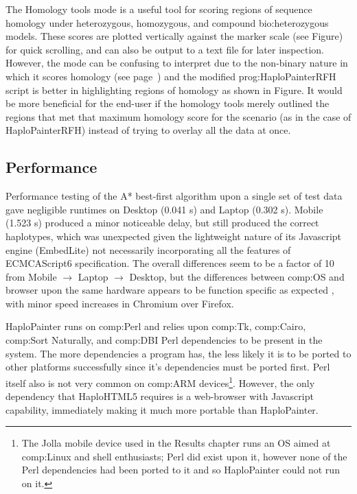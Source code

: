 The Homology tools mode is a useful tool for scoring regions of sequence homology under heterozygous, homozygous, and compound \gls{bio:heterozygous} models. These scores are plotted vertically against the marker scale (see Figure) for quick scrolling, and can also be output to a text file for later inspection. However, the mode can be confusing to interpret due to the non-binary nature in which it scores homology (see page~\pageref{ref:haplo:homologyscoredet}) and the modified \gls{prog:HaploPainterRFH} script is better in highlighting regions of homology as shown in Figure. It would be more beneficial for the end-user if the homology tools merely outlined the regions that met that maximum homology score for the scenario (as in the case of HaploPainterRFH) instead of trying to overlay all the data at once.

\subsection{Performance}

Performance testing of the A* best-first algorithm upon a single set of test data gave negligible runtimes on Desktop (0.041 s) and Laptop (0.302 s). Mobile (1.523 s) produced a minor noticeable delay, but still produced the correct haplotypes, which was unexpected given the lightweight nature of its Javascript engine (EmbedLite) not necessarily incorporating all the features of ECMCAScript6 specification. The overall differences seem to be a factor of 10 from Mobile $\rightarrow$ Laptop $\rightarrow$ Desktop, but the differences between \gls{comp:OS} and browser upon the same hardware appears to be function specific as expected \cite{ratanaworabhan2010jsmeter}, with minor speed increases in Chromium over Firefox.

HaploPainter runs on \gls{comp:Perl} and relies upon \gls{comp:Tk}, \gls{comp:Cairo}, \gls{comp:Sort Naturally}, and \gls{comp:DBI} Perl dependencies to be present in the system. The more dependencies a program has, the less likely it is to be ported to other platforms successfully since it's dependencies must be ported first. Perl itself also is not very common on \gls{comp:ARM} devices\footnote{The Jolla mobile device used in the Results chapter runs an OS aimed at \gls{comp:Linux} and shell enthusiasts; Perl did exist upon it, however none of the Perl dependencies had been ported to it and so HaploPainter could not run on it.}. However, the only dependency that HaploHTML5 requires is a web-browser with Javascript capability, immediately making it much more portable than HaploPainter.

